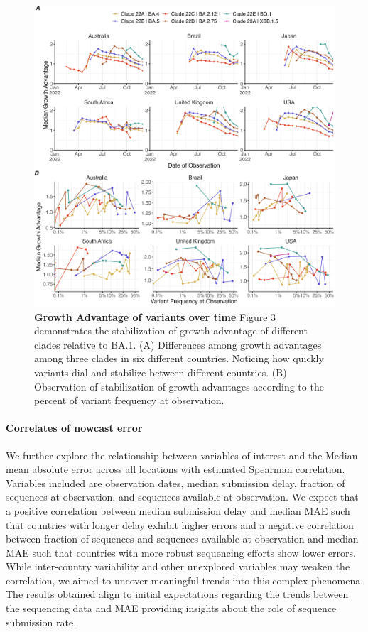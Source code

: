 \documentclass[11pt,oneside,letterpaper]{article}
\begin{document}
\begin{figure}[H]
	\centering
    \includegraphics[width=1.1\textwidth]{figures/ga_estimates.png}
	\caption{\textbf{Growth Advantage of variants over time}
	Figure 3 demonstrates the stabilization of growth advantage of different clades relative to BA.1.
	(A) Differences among growth advantages among three clades in six different countries. 
	Noticing how quickly variants dial and stabilize between different countries.
	(B) Observation of stabilization of growth advantages according to the percent of variant frequency at observation.
	}
	\label{fig:ga_estimates}
\end{figure}

\paragraph{Correlates of nowcast error} We further explore the relationship between variables of interest and the Median mean absolute error across all locations with estimated Spearman correlation.
Variables included are observation dates, median submission delay, fraction of sequences at observation, and sequences available at observation. 
We expect that a positive correlation between median submission delay and median MAE such that countries with longer delay exhibit higher errors and a negative correlation between fraction of sequences and sequences available at observation and median MAE such that countries with more robust sequencing efforts show lower errors. 
While inter-country variability and other unexplored variables may weaken the correlation, we aimed to uncover meaningful trends into this complex phenomena. 
The results obtained align to initial expectations regarding the trends between the sequencing data and MAE providing insights about the role of sequence submission rate. 
\end{document}
